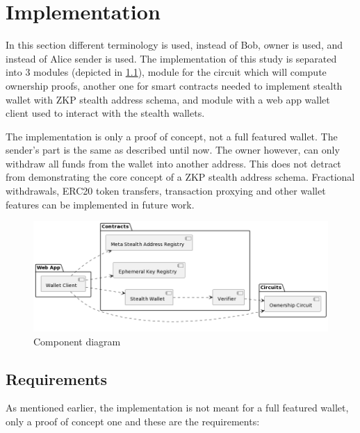 \chapter{Implementation}\label{chapter:implementation}

In this section different terminology is used, instead of Bob, owner is used,
and instead of Alice sender is used. The implementation of this study is
separated into 3 modules (depicted in \ref{fig:component-diagram}), module for the
circuit which will compute ownership proofs, another one for smart contracts
needed to implement stealth wallet with ZKP stealth address schema, and
module with a web app wallet client used to interact with the stealth wallets.

The implementation is only a proof of concept, not a full featured wallet.
The sender's part is the same as described until now. The owner however,
can only withdraw all funds from the wallet into another address. This does
not detract from demonstrating the core concept of a ZKP stealth address schema.
Fractional withdrawals, ERC20 token transfers, transaction proxying and other wallet
features can be implemented in future work.

\begin{figure}[h!]
    \centering
    \includegraphics[width=\textwidth]{assets/images/component-diagram.png}
    \caption{Component diagram}
    \label{fig:component-diagram}
    \vspace{0.5cm}
\end{figure}

\section{Requirements}

As mentioned earlier, the implementation is not meant for a full featured wallet,
only a proof of concept one and these are the requirements:

